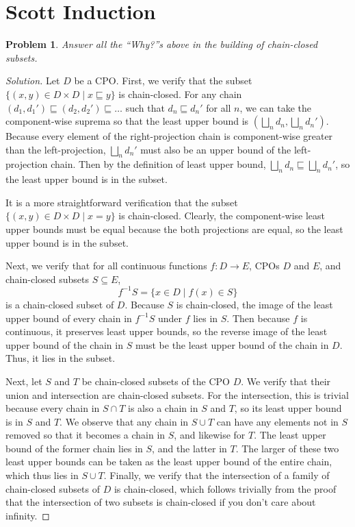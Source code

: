 \documentclass{article}
\newtheorem{problem}{Problem}[section]}
\newcommand{\f}{\rightarrow}
\begin{document}
\section{Scott Induction}

\begin{problem}
    Answer all the ``Why?''s above in the building of chain-closed subsets.
\end{problem}
\begin{proof}[Solution]
    Let $D$ be a CPO. First, we verify that the subset $\{(x,y)\in D\times D\mid
    x\sqsubseteq y\}$ is chain-closed. For any chain
    $(d_1,d_1')\sqsubseteq(d_2,d_2')\sqsubseteq\dots$ such that $d_n\sqsubseteq
    d_n'$ for all $n$, we can take the component-wise suprema so that the least
    upper bound is $(\bigsqcup_n d_n,\bigsqcup_n d_n')$. Because every element
    of the right-projection chain is component-wise greater than the
    left-projection, $\bigsqcup_n d_n'$ must also be an upper bound of the
    left-projection chain. Then by the definition of least upper bound,
    $\bigsqcup_n d_n\sqsubseteq\bigsqcup_n d_n'$, so the least upper bound is in
    the subset.

    It is a more straightforward verification that the subset $\{(x,y)\in
    D\times D\mid x=y\}$ is chain-closed. Clearly, the component-wise least
    upper bounds must be equal because the both projections are equal, so the
    least upper bound is in the subset.

    Next, we verify that for all continuous functions $f:D\f E$, CPOs $D$ and
    $E$, and chain-closed subsets $S\subseteq E$,
    \[
        f^{-1}S=\{x\in D\mid f(x)\in S\}
    \]
    is a chain-closed subset of $D$. Because $S$ is chain-closed, the image of
    the least upper bound of every chain in $f^{-1}S$ under $f$ lies in $S$.
    Then because $f$ is continuous, it preserves least upper bounds, so the
    reverse image of the least upper bound of the chain in $S$ must be the least
    upper bound of the chain in $D$. Thus, it lies in the subset.

    Next, let $S$ and $T$ be chain-closed subsets of the CPO $D$. We verify that
    their union and intersection are chain-closed subsets. For the intersection,
    this is trivial because every chain in $S\cap T$ is also a chain in $S$ and
    $T$, so its least upper bound is in $S$ and $T$. We observe that any chain
    in $S\cup T$ can have any elements not in $S$ removed so that it becomes a
    chain in $S$, and likewise for $T$. The least upper bound of the former
    chain lies in $S$, and the latter in $T$. The larger of these two least
    upper bounds can be taken as the least upper bound of the entire chain,
    which thus lies in $S\cup T$. Finally, we verify that the intersection of a
    family of chain-closed subsets of $D$ is chain-closed, which follows
    trivially from the proof that the intersection of two subsets is
    chain-closed if you don't care about infinity.
\end{proof}
\end{document}

